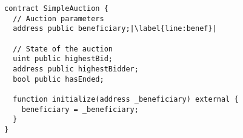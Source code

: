 \begin{lstlisting}[language=Solidity,escapechar=|]
contract SimpleAuction {
  // Auction parameters
  address public beneficiary;|\label{line:benef}|
  
  // State of the auction
  uint public highestBid;
  address public highestBidder;
  bool public hasEnded;

  function initialize(address _beneficiary) external {
    beneficiary = _beneficiary;
  }
}
\end{lstlisting}